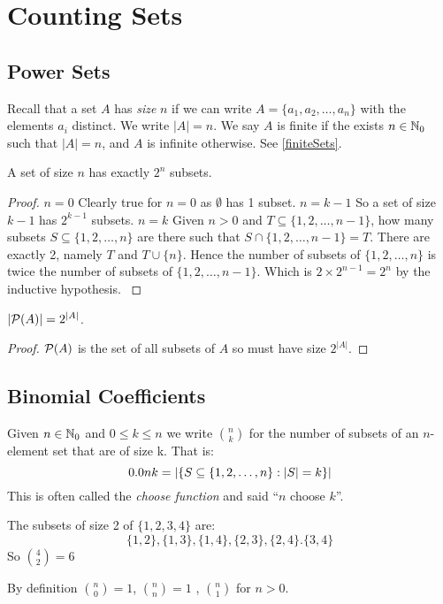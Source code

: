 \documentclass[../main.tex]{subfiles}
\begin{document}
\section{Counting Sets}
\subsection{Power Sets}
\begin{remark}[Reminder]
  Recall that a set $A$ has \textit{size} $n$ if we can write $A = \{a_1, a_2, \ldots, a_n\}$ with the elements $a_i$ distinct.
  We write $|A| = n$.
  We say $A$ is finite if the exists $n \in \mathbb{N}_0$ such that $|A| = n$, and $A$ is infinite otherwise.
  See \cref{finiteSets}.
\end{remark}
\begin{proposition}
  A set of size $n$ has exactly $2^{n}$ subsets.
\end{proposition}
\begin{proof}
  \induction
  {$n = 0$}{
    Clearly true for $n = 0$ as $\emptyset$ has 1 subset.
  }
  {$n = k - 1$}{
    So a set of size $k - 1$ has $2^{k - 1}$ subsets.
  }
  {$n = k$}{
    Given $n > 0$ and $T \subseteq \{1, 2, \ldots, n - 1\}$, how many subsets $S \subseteq \{1, 2, \ldots, n\}$ are there such that $S \cap \{1, 2, \ldots, n - 1\} = T$.
    There are exactly 2, namely $T$ and $T \cup \{n\}$.
    Hence the number of subsets of $\{1, 2, \ldots, n\}$ is twice the number of subsets of $\{1, 2, \ldots, n - 1\}$. Which is $2 \times 2^{n - 1} = 2^{n}$ by the inductive hypothesis.
  }
\end{proof}
\begin{corollary}
  $|\mathcal{P}(A)| = 2^{|A|}$.
\end{corollary}
\begin{proof}
  $\mathcal{P}(A)$ is the set of all subsets of $A$ so must have size $2^{|A|}$.
\end{proof}

\subsection{Binomial Coefficients}
\begin{definition}
  Given $n \in \mathbb{N}_0$ and $0 \leq k \leq n$ we write $\binom{n}{k}$ for the number of subsets of an $n$-element set that are of size k.
  That is:
  \[
    \binom{n}{k} = \abs{\{S \subseteq \{1, 2, \ldots, n\} : |S| = k\}}
  \]
  This is often called the \textit{choose function} and said ``$n$ choose $k$''.
\end{definition}
\begin{example}
  The subsets of size 2 of $\{1, 2, 3, 4\}$ are:
  \[
    \{1, 2\}, \{1, 3\}, \{1, 4\}, \{2, 3\}, \{2, 4\}. \{3, 4\}
  \]
  So $\binom{4}{2} = 6$
\end{example}
By definition $\binom{n}{0} = 1$, $\binom{n}{n} = 1$ , $\binom{n}{1}$ for $n > 0$.
\end{document}
